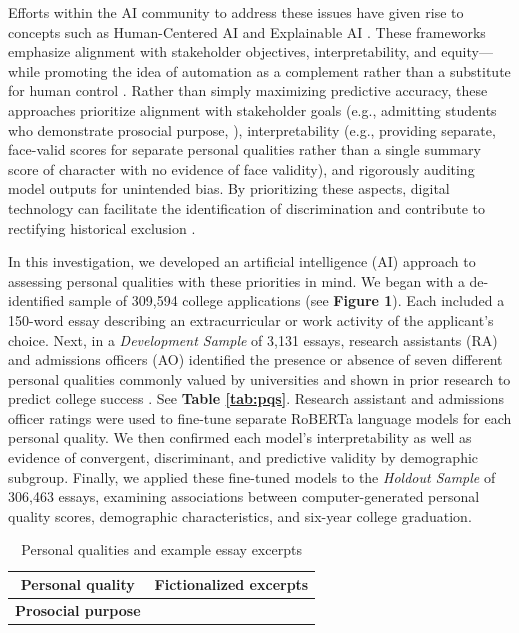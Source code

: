 \documentclass[11pt]{report}
\begin{document}
\begin{mainf}
Efforts within the AI community to address these issues have given rise to concepts such as Human-Centered AI \cite{riedl_humancentered_2019, shneiderman_human-centered_2020} and Explainable AI \cite{gunning_xaiexplainable_2019}. 
These frameworks emphasize alignment with stakeholder objectives, interpretability, and equity---while promoting the idea of automation as a complement rather than a substitute for human control \cite{shneiderman_human-centered_2020}. 
    Rather than simply maximizing predictive accuracy, these approaches prioritize alignment with stakeholder goals (e.g., admitting students who demonstrate prosocial purpose, \cite{noauthor_our_2021}), interpretability (e.g., providing separate, face-valid scores for separate personal qualities rather than a single summary score of character with no evidence of face validity), and rigorously auditing model outputs for unintended bias. By prioritizing these aspects, digital technology can facilitate the identification of discrimination and contribute to rectifying historical exclusion \cite{lobel_equality_2022}.

In this investigation, we developed an artificial intelligence (AI) approach to assessing personal qualities with these priorities in mind. 
We began with a de-identified sample of 309,594 college applications (see \textbf{Figure 1}). Each included a 150-word essay describing an extracurricular or work activity of the applicant’s choice. Next, in a \textit{Development Sample} of 3,131 essays, research assistants (RA) and admissions officers (AO) identified the presence or absence of seven different personal qualities commonly valued by universities and shown in prior research to predict college success \cite{almlund_personality_2011}. See \textbf{Table \ref{tab:pqs}}. Research assistant and admissions officer ratings were used to fine-tune separate RoBERTa language models \cite{liu_roberta_2019} for each personal quality. We then confirmed each model’s interpretability as well as evidence of convergent, discriminant, and predictive validity by demographic subgroup. Finally, we applied these fine-tuned models to the \textit{Holdout Sample} of 306,463 essays, examining associations between computer-generated personal quality scores, demographic characteristics, and six-year college graduation.

\begin{table}[ht]
\footnotesize
\caption{Personal qualities and example essay excerpts}
\def\arraystretch{1}%
\begin{tabular}{  p{.275\linewidth}  p{.675\linewidth}}
\hline
\multicolumn{1}{c}{\textbf{Personal quality}} & \multicolumn{1}{c}{\textbf{Fictionalized excerpts}}\\                                                                      \hline
\textbf{Prosocial purpose}


\end{tabular}
\end{table}
\end{mainf}
\end{document}
